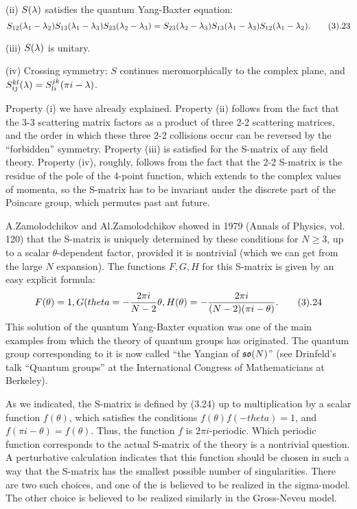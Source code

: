 (ii) $S(\lambda)$ satisfies the quantum Yang-Baxter equation:
$$
S_{12}(\l_1-\l_2)S_{13}(\l_1-\l_3)S_{23}(\l_2-\l_3)=
S_{23}(\l_2-\l_3)S_{13}(\l_1-\l_3)S_{12}(\l_1-\l_2).\tag 3.23
$$

(iii) $S(\lambda)$ is unitary. 
  
(iv) Crossing symmetry: $S$ continues 
meromorphically to the complex 
plane, and $S_{ij}^{kl}(\lambda)=S_{li}^{jk}(\pi i-\lambda)$.

Property (i) we have already explained. Property (ii) follows 
from the fact that the 3-3 scattering matrix factors as a product 
of three 2-2 scattering matrices, and the order in which 
these three 2-2 collisions occur can be reversed by the ``forbidden'' 
symmetry. Property (iii) is satisfied for the S-matrix of any field theory. 
Property (iv), roughly,
 follows from the fact that the 2-2 S-matrix is the residue
of the pole of the 4-point function, which extends to the complex 
values of momenta, so the S-matrix has to be invariant under the 
discrete part of the Poincare group, which permutes past ant future.

A.Zamolodchikov and Al.Zamolodchikov showed in 1979 
(Annals of Physics, vol. 120) that the S-matrix
is uniquely determined by these conditions for $N\ge 3$, 
up to a scalar $\theta$-dependent factor, provided it is nontrivial
(which we can get from the large $N$ expansion). 
The functions $F,G,H$ for this S-matrix is given by 
an easy explicit formula: 
$$
F(\theta)=1, G(theta=-\frac{2\pi i}{N-2}\theta, H(\theta)=
-\frac{2\pi i}{(N-2)(\pi i-\theta)}.\tag 3.24
$$
This solution of the quantum Yang-Baxter equation was one of the main examples
from which the theory of quantum groups has originated. 
The quantum group corresponding to it is now called 
``the Yangian of $\frak{so}(N)$'' (see Drinfeld's talk ``Quantum groups''
at the International Congress of Mathematicians at Berkeley).

As we indicated, the S-matrix is defined by (3.24) up to 
multiplication by a scalar function 
$f(\theta)$, which satisfies the conditions
$f(\theta)f(-theta)=1$, and $f(\pi i-\theta)=f(\theta)$. 
Thus, the function $f$ is $2\pi i$-periodic. 
Which periodic function corresponds to the actual S-matrix of
the theory is a nontrivial question. A perturbative calculation indicates
that this function should be chosen in such a way that the S-matrix has 
the smallest possible number of singularities. There are two such choices,
and one of the is believed to be realized in the sigma-model. 
The other choice is believed to be realized similarly in the Gross-Neveu 
model. 

